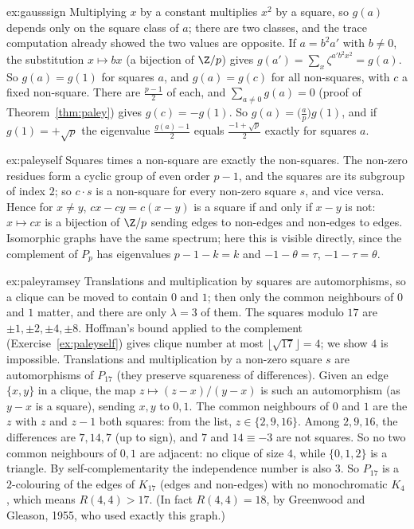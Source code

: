 \begin{solution}{ex:gausssign}
\idea Multiplying $x$ by a constant multiplies $x^2$ by a square, so $g(a)$ depends only on the square class of $a$; there are two
classes, and the trace computation already showed the two values are opposite.
\writeup If $a=b^2a'$ with $b\ne0$, the substitution $x\mapsto bx$ (a bijection of $\Z/p$) gives $g(a')=\sum_x\zeta^{a'b^2x^2}=g(a)$. So
$g(a)=g(1)$ for squares $a$, and $g(a)=g(c)$ for all non-squares, with $c$ a fixed non-square. There are $\frac{p-1}2$ of each, and
$\sum_{a\ne0}g(a)=0$ (proof of Theorem~\ref{thm:paley}) gives $g(c)=-g(1)$. So $g(a)=\bigl(\frac ap\bigr)g(1)$, and if $g(1)=+\sqrt p$
the eigenvalue $\frac{g(a)-1}2$ equals $\frac{-1+\sqrt p}2$ exactly for squares $a$.
\end{solution}

\begin{solution}{ex:paleyself}
\idea Squares times a non-square are exactly the non-squares.
\writeup The non-zero residues form a cyclic group of even order $p-1$, and the squares are its subgroup of index $2$; so $c\cdot s$ is
a non-square for every non-zero square $s$, and vice versa. Hence for $x\ne y$, $cx-cy=c(x-y)$ is a square if and only if $x-y$
is not: $x\mapsto cx$ is a bijection of $\Z/p$ sending edges to non-edges and non-edges to edges. Isomorphic graphs have the same
spectrum; here this is visible directly, since the complement of $P_p$ has eigenvalues $p-1-k=k$ and $-1-\theta=\tau$, $-1-\tau=\theta$.
\end{solution}

\begin{solution}{ex:paleyramsey}
\idea Translations and multiplication by squares are automorphisms, so a clique can be moved to contain $0$ and $1$; then only the
common neighbours of $0$ and $1$ matter, and there are only $\lambda=3$ of them.
\writeup The squares modulo $17$ are $\pm1,\pm2,\pm4,\pm8$. Hoffman's bound applied to the complement (Exercise~\ref{ex:paleyself})
gives clique number at most $\lfloor\sqrt{17}\rfloor=4$; we show $4$ is impossible. Translations and multiplication by a non-zero
square $s$ are automorphisms of $P_{17}$ (they preserve squareness of differences). Given an edge $\{x,y\}$ in a clique, the map
$z\mapsto(z-x)/(y-x)$ is such an automorphism (as $y-x$ is a square), sending $x,y$ to $0,1$. The common neighbours of $0$ and $1$ are
the $z$ with $z$ and $z-1$ both squares: from the list, $z\in\{2,9,16\}$. Among $2,9,16$, the differences are $7,14,7$ (up to sign),
and $7$ and $14\equiv-3$ are not squares. So no two common neighbours of $0,1$ are adjacent: no clique of size $4$, while $\{0,1,2\}$ is a
triangle. By self-complementarity the independence number is also $3$. So $P_{17}$ is a $2$-colouring of the edges of $K_{17}$ (edges
and non-edges) with no monochromatic $K_4$, which means $R(4,4)>17$. (In fact $R(4,4)=18$, by Greenwood and Gleason, 1955, who used
exactly this graph.)
\end{solution}

